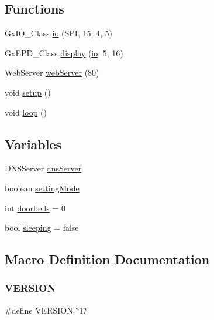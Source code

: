 \subsection*{Functions}
\begin{DoxyCompactItemize}
\item 
Gx\+I\+O\+\_\+\+Class \mbox{\hyperlink{_doorbell_8ino_acfc2fc23d5e539f2d0b9ed6091a6c24e}{io}} (S\+PI, 15, 4, 5)
\item 
Gx\+E\+P\+D\+\_\+\+Class \mbox{\hyperlink{_doorbell_8ino_a316a5fbb017a97dc4c8a9f1383f7b4b0}{display}} (\mbox{\hyperlink{_doorbell_8ino_acfc2fc23d5e539f2d0b9ed6091a6c24e}{io}}, 5, 16)
\item 
Web\+Server \mbox{\hyperlink{_doorbell_8ino_ae4f1791fd59f61a92af54c63a79ac112}{web\+Server}} (80)
\item 
void \mbox{\hyperlink{_doorbell_8ino_a4fc01d736fe50cf5b977f755b675f11d}{setup}} ()
\item 
void \mbox{\hyperlink{_doorbell_8ino_afe461d27b9c48d5921c00d521181f12f}{loop}} ()
\end{DoxyCompactItemize}
\subsection*{Variables}
\begin{DoxyCompactItemize}
\item 
D\+N\+S\+Server \mbox{\hyperlink{_doorbell_8ino_a52c5394c861b62875409604eedc0fcd7}{dns\+Server}}
\item 
boolean \mbox{\hyperlink{_doorbell_8ino_a5c64e18eb1e6df97544212e53facd531}{setting\+Mode}}
\item 
int \mbox{\hyperlink{_doorbell_8ino_acb9e18b536f640e95c60f0c3ebe17766}{doorbells}} = 0
\item 
bool \mbox{\hyperlink{_doorbell_8ino_afc77d1fb95870b5511dffff362261cb6}{sleeping}} = false
\end{DoxyCompactItemize}


\subsection{Macro Definition Documentation}
\mbox{\label{_doorbell_8ino_a1c6d5de492ac61ad29aec7aa9a436bbf}} 
\subsubsection{\texorpdfstring{VERSION}{VERSION}}
{\footnotesize\ttfamily \#define V\+E\+R\+S\+I\+ON~\char`\"{}1.\char`\"{}}



